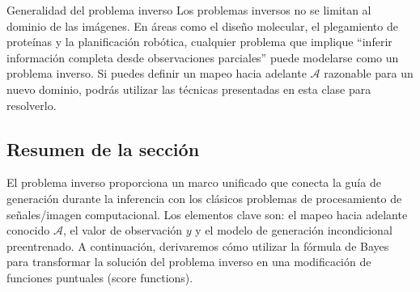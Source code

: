 \begin{knowledgebox}{Generalidad del problema inverso}
Los problemas inversos no se limitan al dominio de las imágenes. En áreas como el diseño molecular, el plegamiento de proteínas y la planificación robótica, cualquier problema que implique ``inferir información completa desde observaciones parciales'' puede modelarse como un problema inverso. Si puedes definir un mapeo hacia adelante $\mathcal{A}$ razonable para un nuevo dominio, podrás utilizar las técnicas presentadas en esta clase para resolverlo.
\end{knowledgebox}

\subsection{Resumen de la sección}

El problema inverso proporciona un marco unificado que conecta la guía de generación durante la inferencia con los clásicos problemas de procesamiento de señales/imagen computacional. Los elementos clave son: el mapeo hacia adelante conocido $\mathcal{A}$, el valor de observación $y$ y el modelo de generación incondicional preentrenado. A continuación, derivaremos cómo utilizar la fórmula de Bayes para transformar la solución del problema inverso en una modificación de funciones puntuales (score functions).

